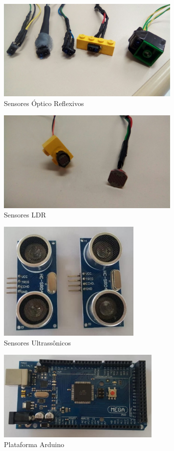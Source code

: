 \begin{figure}[!htb]
	\centering
	\includegraphics[width=9cm]{images/sensores2.png}
	\caption{Sensores Óptico Reflexivos}
	\label{sensores2}
\end{figure}

\begin{figure}[!htb]
	\centering
	\includegraphics[width=9cm]{images/sensores3.png}
	\caption{Sensores LDR}
	\label{sensores3}
\end{figure}

\begin{figure}[!htb]
	\centering
	\includegraphics[width=7cm]{images/sensores4.png}
	\caption{Sensores Ultrassônicos}
	\label{sensores4}
\end{figure}

\begin{figure}[!htb]
	\centering
	\includegraphics[width=8cm]{images/arduino.png}
	\caption{Plataforma Arduino}
	\label{arduino}
\end{figure}

